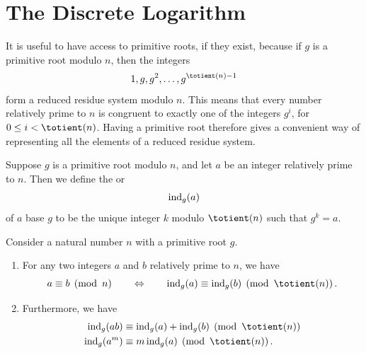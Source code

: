 \section{The Discrete Logarithm}

It is useful to have access to primitive roots, if they exist, because if $g$ is a primitive root modulo $n$, then the integers
\begin{equation*}
  1,g,g^2,\ldots,g^{\totient(n)-1}
\end{equation*}
form a reduced residue system modulo $n$. This means that every number relatively prime to $n$ is congruent to exactly one of the integers $g^i$, for $0\leq i<\totient(n)$. Having a primitive root therefore gives a convenient way of representing all the elements of a reduced residue system.

\begin{definition}
  Suppose $g$ is a primitive root modulo $n$, and let $a$ be an integer relatively prime to $n$. Then we define the  or 
  \begin{equation*}
    \operatorname{ind}_g(a)
  \end{equation*}
  of $a$ base $g$ to be the unique integer $k$ modulo $\totient(n)$ such that $g^{k}=a$.
\end{definition}

\begin{theorem}
  Consider a natural number $n$ with a primitive root $g$.
  \begin{enumerate}
  \item For any two integers $a$ and $b$ relatively prime to $n$, we have
    \begin{equation*}
      a\equiv b\pmod{n}\qquad\Leftrightarrow\qquad\ind_g(a)\equiv\ind_g(b)\pmod{\totient(n)}.
    \end{equation*}
  \item Furthermore, we have
    \begin{align*}
      \ind_g(ab) & \equiv \ind_g(a)+\ind_g(b)\pmod{\totient(n)} \\
      \ind_g(a^m) & \equiv m\ind_g(a)\pmod{\totient(n)}.
    \end{align*}
  \end{enumerate}
\end{theorem}


